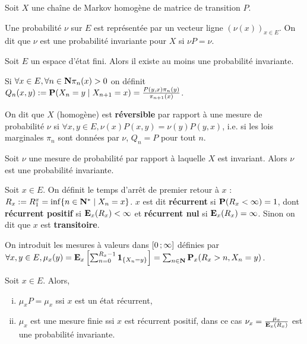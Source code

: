 Soit $X$ une chaîne de Markov homogène de matrice de transition $P$.

\begin{defn}
	Une probabilité $\nu$ sur $E$ est représentée par un vecteur ligne $(\nu(x))_{x \in E}$.
	On dit que $\nu$ est une probabilité invariante pour $X$ si $\nu P = \nu$.
\end{defn}

\begin{thm}
	Soit $E$ un espace d'état fini.
	Alors il existe au moins une probabilité invariante.
\end{thm}

Si $\forall x \in E, \forall n \in \mathbf{N}\pi_n(x) > 0$ on définit $Q_n(x,y) := \mathbf{P}(X_n = y \mid X_{n + 1} = x) = \frac{P(y,x) \pi_n(y)}{\pi_{n + 1}(x)}$.

\begin{defn}
	On dit que $X$ (homogène) est \textbf{réversible} par rapport à une mesure de probabilité $\nu$ si $\forall x,y \in E, \nu(x) P(x,y) = \nu(y) P(y,x)$, i.e. si les lois marginales $\pi_n$ sont données par $\nu$, $Q_n = P$ pour tout $n$.
\end{defn}

\begin{pop}
	Soit $\nu$ une mesure de probabilité par rapport à laquelle $X$ est invariant.
	Alors $\nu$ est une probabilité invariante.
\end{pop}

\begin{defn}
	Soit $x \in E$.
	On définit le temps d'arrêt de premier retour à $x$ : $R_x := R_1^x = \inf \{ n \in \mathbf{N}^* \mid X_n = x \}$.
	$x$ est dit \textbf{récurrent} si $\mathbf{P}(R_x < \infty) = 1$, dont \textbf{récurrent positif} si $\mathbf{E}_x(R_x) < \infty$ et \textbf{récurrent nul} si $\mathbf{E}_x(R_x) = \infty$.
	Sinon on dit que $x$ est \textbf{transitoire}.
\end{defn}

On introduit les mesures à valeurs dans $\mathopen{[}0\mathclose{}\mathpunct{};\infty\mathclose{]}$ définies par $\forall x,y \in E, \mu_x(y) = \mathbf{E}_x \left[ \sum_{n = 0}^{R_x - 1} \operatorname{\mathbf{1}}_{\{ X_n = y \} } \right] = \sum_{n \in \mathbf{N}} \mathbf{P}_x(R_x > n, X_n = y)$.

\begin{pop}
	Soit $x \in E$. Alors,
	\begin{enumerate}[(i)]
		\item $\mu_x P = \mu_x$ ssi $x$ est un état récurrent,
		\item $\mu_x$ est une mesure finie ssi $x$ est récurrent positif, dans ce cas $\nu_x = \frac{\mu_x}{\mathbf{E}_x(R_x)}$ est une probabilité invariante.
	\end{enumerate}
\end{pop}

